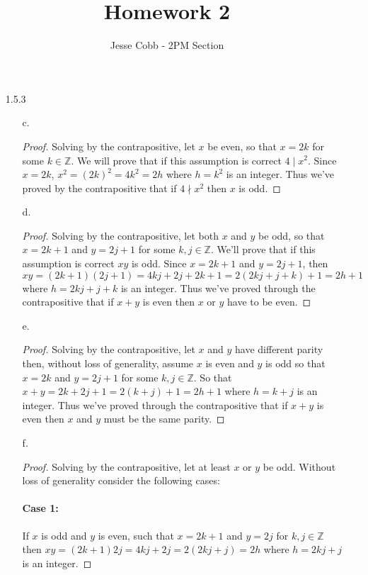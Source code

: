 \documentclass[11pt]{amsart}
\theoremstyle{definition}
\begin{document}
\title{Homework 2}

\author{Jesse Cobb - 2PM Section}

\maketitle

\begin{itemize}

\item[1.5.3]
\begin{itemize}
    \item[c.] \begin{proof}
        Solving by the contrapositive, let $x$ be even, so that $x=2k$ for some $k\in\mathbb{Z}$. We will prove that if this assumption is correct $4\mid x^2$. Since $x=2k$, $x^2=(2k)^2=4k^2=2h$ where $h=k^2$ is an integer. Thus we've proved by the contrapositive that if $4\nmid x^2$ then $x$ is odd.
    \end{proof}

    \item[d.] \begin{proof}
        Solving by the contrapositive, let both $x$ and $y$ be odd, so that $x=2k+1$ and $y=2j+1$ for some $k,j\in\mathbb{Z}$. We'll prove that if this assumption is correct $xy$ is odd. Since $x=2k+1$ and $y=2j+1$, then $xy=(2k+1)(2j+1)=4kj+2j+2k+1=2(2kj+j+k)+1=2h+1$ where $h=2kj+j+k$ is an integer. Thus we've proved through the contrapositive that if $x+y$ is even then $x$ or $y$ have to be even.
    \end{proof}

    \item[e.] \begin{proof}
        Solving by the contrapositive, let $x$ and $y$ have different parity then, without loss of generality, assume $x$ is even and $y$ is odd so that $x=2k$ and $y=2j+1$ for some $k,j\in\mathbb{Z}$. So that $x+y=2k+2j+1=2(k+j)+1=2h+1$ where $h=k+j$ is an integer. Thus we've proved through the contrapositive that if $x+y$ is even then $x$ and $y$ must be the same parity.
    \end{proof}

    \item[f.] \begin{proof}
        Solving by the contrapositive, let at least $x$ or $y$ be odd. Without loss of generality consider the following cases:
        \paragraph{Case 1:}
            If $x$ is odd and $y$ is even, such that $x=2k+1$ and $y=2j$ for $k,j\in\mathbb{Z}$ then $xy=(2k+1)2j=4kj+2j=2(2kj+j)=2h$ where $h=2kj+j$ is an integer.

\end{proof}
\end{itemize}
\end{itemize}
\end{document}
